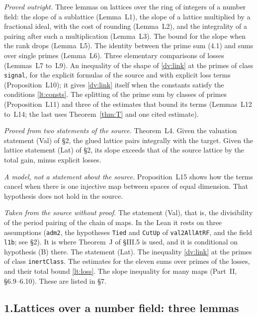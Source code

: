 \documentclass[11pt,letterpaper]{article}
\begin{document}
\emph{Proved outright.} Three lemmas on lattices over the ring of integers of a number field: the slope of
a sublattice (Lemma~L1), the slope of a lattice multiplied by a fractional ideal, with the cost of rounding
(Lemma~L2), and the integrality of a pairing after such a multiplication (Lemma~L3). The bound for the
slope when the rank drops (Lemma~L5). The identity between the prime sum (4.1) and sums over single primes
(Lemma~L6). Three elementary comparisons of losses (Lemmas~L7 to~L9). An inequality of the shape of
\eqref{dv:link} at the primes of class \texttt{signal}, for the explicit formulas of the source and with
explicit loss terms (Proposition~L10); it gives \eqref{dv:link} itself when the constants satisfy the
conditions \eqref{lt:consts}. The splitting of the prime sum by classes of primes (Proposition~L11) and three of
the estimates that bound its terms (Lemmas~L12 to~L14; the last uses Theorem~\ref{thm:T} and one cited
estimate).

\emph{Proved from two statements of the source.} Theorem~L4. Given the valuation statement \textup{(Val)}
of \S2, the glued lattice pairs integrally with the target. Given the lattice statement \textup{(Lat)} of
\S2, its slope exceeds that of the source lattice by the total gain, minus explicit losses.

\emph{A model, not a statement about the source.} Proposition~L15 shows how the terms cancel when there
is one injective map between spaces of equal dimension. That hypothesis does not hold in the source.

\emph{Taken from the source without proof.} The statement \textup{(Val)}, that is, the divisibility of the
period pairing of the chain of maps. In the Lean it rests on three assumptions (\texttt{adm2}, the
hypotheses \texttt{Tied} and \texttt{CutUp} of \texttt{val2AllAtRF}, and the field \texttt{l1b}; see \S2). It is where Theorem~J of \S III.5
is used, and it is conditional on hypothesis \textup{(B)} there. The statement \textup{(Lat)}. The
inequality \eqref{dv:link} at the primes of class \texttt{inertClass}. The estimates for the eleven sums over primes
of the losses, and their total bound \eqref{lt:loss}. The slope inequality for many maps (Part~II, \S6.9--6.10). These are listed in \S7.

\subsection*{1.\quad Lattices over a number field: three lemmas}
\end{document}
